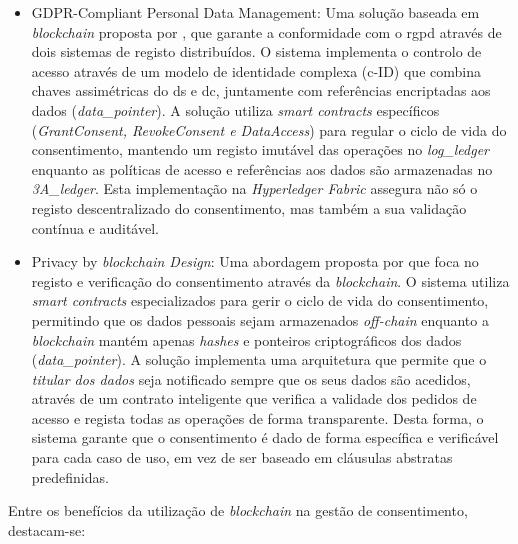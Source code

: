 \begin{itemize}
    \item GDPR-Compliant Personal Data Management: Uma solução baseada em \textit{blockchain} proposta por \citep{nguyen2020gdpr}, que garante a conformidade com o \acrshort{rgpd} através de dois sistemas de registo distribuídos. O sistema implementa o controlo de acesso através de um modelo de identidade complexa (c-ID) que combina chaves assimétricas do \acrshort{ds} e \acrshort{dc}, juntamente com referências encriptadas aos dados (\textit{data\_pointer}). A solução utiliza \textit{smart contracts} específicos (\textit{GrantConsent, RevokeConsent e DataAccess}) para regular o ciclo de vida do consentimento, mantendo um registo imutável das operações no \textit{log\_ledger} enquanto as políticas de acesso e referências aos dados são armazenadas no \textit{3A\_ledger}. Esta implementação na \textit{Hyperledger Fabric} assegura não só o registo descentralizado do consentimento, mas também a sua validação contínua e auditável.

    \item Privacy by \textit{blockchain Design}: Uma abordagem proposta por \citep{wirth2018privacy} que foca no registo e verificação do consentimento através da \textit{blockchain}. O sistema utiliza \textit{smart contracts} especializados para gerir o ciclo de vida do consentimento, permitindo que os dados pessoais sejam armazenados \textit{off-chain} enquanto a \textit{blockchain} mantém apenas \textit{hashes} e ponteiros criptográficos dos dados (\textit{data\_pointer}). A solução implementa uma arquitetura que permite que o \textit{titular dos dados} seja notificado sempre que os seus dados são acedidos, através de um contrato inteligente que verifica a validade dos pedidos de acesso e regista todas as operações de forma transparente. Desta forma, o sistema garante que o consentimento é dado de forma específica e verificável para cada caso de uso, em vez de ser baseado em cláusulas abstratas predefinidas.
\end{itemize}

Entre os benefícios da utilização de \textit{blockchain} na gestão de consentimento, destacam-se:

